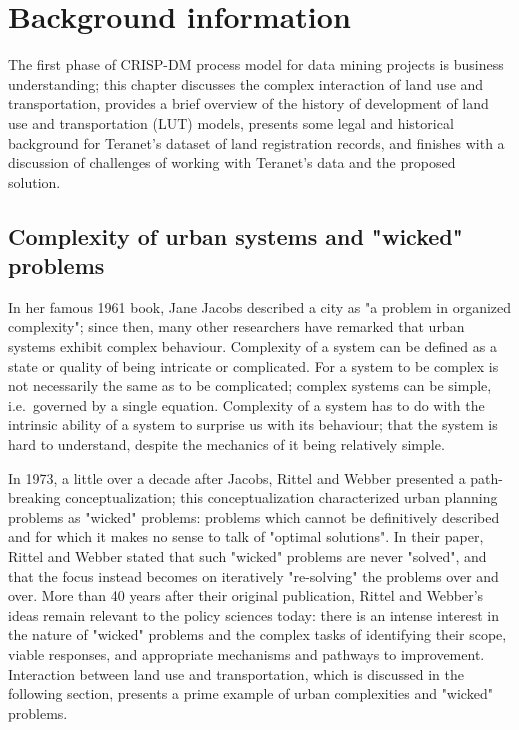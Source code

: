 \chapter[Background information]{Background information} \label{ch:background}

The first phase of CRISP-DM process model for data mining projects is business understanding;
this chapter discusses the complex interaction of land use and transportation, provides a brief overview of the history of development of land use and transportation (LUT) models, presents some legal and historical background for Teranet's dataset of land registration records, and finishes with a discussion of challenges of working with Teranet's data and the proposed solution.

\section{Complexity of urban systems and "wicked" problems} \label{sec:complexity_and_wicked_problems}

In her famous 1961 book, Jane Jacobs\cite{Jacobs1961} described a city as "a problem in organized complexity";
since then, many other researchers have remarked that urban systems exhibit complex behaviour\cite{Batty2008, Bettencourt2013}.
Complexity of a system can be defined as a state or quality of being intricate or complicated.
For a system to be complex is not necessarily the same as to be complicated;
complex systems can be simple, i.e.\ governed by a single equation.
Complexity of a system has to do with the intrinsic ability of a system to surprise us with its behaviour;
that the system is hard to understand, despite the mechanics of it being relatively simple.

In 1973, a little over a decade after Jacobs, Rittel and Webber\cite{Rittel1973} presented a path-breaking conceptualization;
this conceptualization characterized urban planning problems as "wicked" problems: problems which cannot be definitively described and for which it makes no sense to talk of "optimal solutions".
In their paper, Rittel and Webber stated that such "wicked" problems are never "solved", and that the focus instead becomes on iteratively "re-solving" the problems over and over.
More than 40 years after their original publication, Rittel and Webber's ideas remain relevant to the policy sciences today: there is an intense interest in the nature of "wicked" problems and the complex tasks of identifying their scope, viable responses, and appropriate mechanisms and pathways to improvement\cite{Crowley2017}.
Interaction between land use and transportation, which is discussed in the following section, presents a prime example of urban complexities and "wicked" problems.

